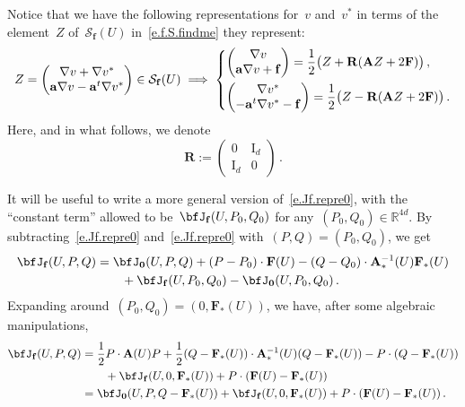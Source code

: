 \documentclass[11pt,twoside]{article} %
\numberwithin{equation}{section}
\theoremstyle{definition}
\let\originalleft\left
\let\originalright\right
\renewcommand{\left}{\mathopen{}\mathclose\bgroup\originalleft}
\renewcommand{\right}{\aftergroup\egroup\originalright}
\newcommand*{\Id}{\ensuremath{\mathrm{I}_d}}
\newcommand*{\R}{\ensuremath{\mathbb{R}}}
\newcommand{\f}{\mathbf{f}}
\renewcommand{\a}{\mathbf{a}}
\newcommand{\bfzero}{\boldsymbol{0}}
\renewcommand{\S}{\mathcal{S}}
\newcommand{\bfA}{\mathbf{A}}
\newcommand{\bfF}{\mathbf{F}}
\newcommand{\rota}{\mathbf{R}}
\begin{document}
Notice that we have the following representations for~$v$ and~$v^*$ in terms of the element~$Z$ of~$\S_{\f}(U)$ in~\eqref{e.f.S.findme} they represent: 
\begin{equation} \label{e.f.splittingformula.for.Z}
Z = 
\begin{pmatrix} \nabla v + \nabla v^* \\ \a \nabla v - \a^t \nabla v^* \end{pmatrix}  \in \S_{\f}(U) 
\implies 
\left\{
\begin{aligned}
& \begin{pmatrix} \nabla v \\ \a \nabla v + \f \end{pmatrix} = \frac12 \bigl(Z + \rota ( \bfA Z + 2 \bfF) \bigr) 
 \,, 
\\ &   
\begin{pmatrix} \nabla v^* \\ - \a^t \nabla v^* - \f \end{pmatrix} = \frac12 \bigl( Z - \rota ( \bfA Z + 2 \bfF) \bigr) 
\,.
\end{aligned}
\right.
\end{equation}
Here, and in what follows, we denote
\begin{equation} 
\label{e.rota}
\rota:= \begin{pmatrix} 0 & \Id \\ \Id & 0 \end{pmatrix} \,.
\end{equation}



\smallskip


It will be useful to write a more general version of~\eqref{e.Jf.repre0}, with the ``constant term'' allowed to be~$\bfJ_{\f}(U,P_0,Q_0)$ for any~$(P_0,Q_0)\in\R^{4d}$. By subtracting~\eqref{e.Jf.repre0} and~\eqref{e.Jf.repre0} with~$(P,Q)=(P_0,Q_0)$, we get
\begin{align}
\label{e.Jf.repre.gen}
\bfJ_{\f}(U,P,Q) 
&
=
\bfJ_{\bfzero} (U,P,Q) 
+ (P - P_0) \cdot \bfF(U)
- (Q - Q_0) \cdot \bfA_*^{-1}(U) \bfF_*(U) 
\notag \\ & \qquad 
+ \bfJ_{\f}(U,P_0,Q_0) - \bfJ_{\bfzero} (U,P_0,Q_0)  \,.
\end{align}
Expanding around~$(P_0,Q_0)=(0,\bfF_*(U))$, we have, after some algebraic manipulations,  
\begin{align} 
\label{e.Jf.repre0zoop}
\bfJ_{\f}(U, P,Q ) 
&
=
\frac 12 P \cdot \bfA(U) P 
+
\frac12 (Q-\bfF_*(U)  ) \cdot \bfA_*^{-1}(U) (Q-\bfF_*(U)  )
-
P \cdot (Q-\bfF_*(U))
\notag \\ & \qquad 
+ 
\bfJ_{\f}(U,0,\bfF_*(U) )
+ P \cdot (\bfF(U)-\bfF_*(U))
\\ & \label{e.Jf.repre0zoopie}
=
\bfJ_{\bfzero}(U,P,Q-\bfF_*(U)) + 
\bfJ_{\f}(U,0,\bfF_*(U) )
+ P \cdot (\bfF(U)-\bfF_*(U))
\,.
\end{align}
\end{document}
